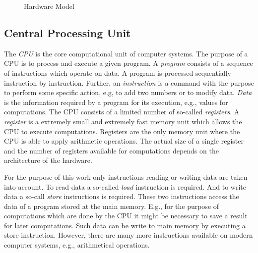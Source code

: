 \documentclass[onecolumn, openright, master, english, signatures]{dbrgrptt}
\begin{document}
\begin{figure}[!ht]
  \centering
  
  \caption{Hardware Model}
  \label{fig:hardware-model}
\end{figure}

\subsection{Central Processing Unit}
The \emph{\ac{CPU}} is the core computational unit of computer systems. The purpose of a \ac{CPU} is to process and execute a given program. A \emph{program} consists of a sequence of instructions which operate on data. A program is processed sequentially instruction by instruction. Further, an \emph{instruction} is a command with the purpose to perform some specific action, e.g, to add two numbers or to modify data. \emph{Data} is the information required by a program for its execution, e.g., values for computations. The \ac{CPU} consists of a limited number of so-called \emph{registers}. A \emph{register} is a extremely small and extremely fast memory unit which allows the \ac{CPU} to execute computations. Registers are the only memory unit where the \ac{CPU} is able to apply arithmetic operations. The actual size of a single register and the number of registers available for computations depends on the architecture of the hardware.

For the purpose of this work only instructions reading or writing data are taken into account. To read data a so-called \emph{load} instruction is required. And to write data a so-call \emph{store} instructions is required. These two instructions access the data of a program stored at the main memory. E.g., for the purpose of computations which are done by the \ac{CPU} it might be necessary to save a result for later computations. Such data can be write to main memory by executing a store instruction. However, there are many more instructions available on modern computer systems, e.g., arithmetical operations.
\end{document}
